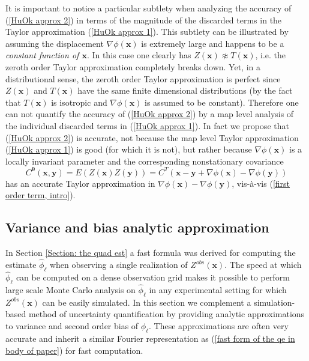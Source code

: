 \documentclass[10pt,noinfoline]{imsart}
\newcommand{\bs}{\boldsymbol}
\begin{document}
It is important to notice a particular subtlety when analyzing the accuracy of  (\ref{HuOk approx 2}) in terms of the magnitude of the discarded terms in the Taylor approximation (\ref{HuOk approx 1}). This subtlety can be illustrated by assuming the displacement $\nabla \phi(\bs x)$ is extremely large and happens to be a \textit{constant function of $\bs x$}. In this case one clearly has $Z(\bs x) \not\approx T(\bs x)$, i.e. the zeroth order Taylor approximation completely breaks down. Yet, in a distributional sense, the zeroth order Taylor approximation is perfect since $Z(\bs x)$ and $T(\bs x)$ have the same finite dimensional distributions (by the fact that $T(\bs x)$ is isotropic and $\nabla \phi(\bs x)$ is assumed to be constant).
Therefore one can not quantify the accuracy of (\ref{HuOk approx 2}) by a map level analysis of the individual discarded terms in (\ref{HuOk approx 1}).
In fact we propose that (\ref{HuOk approx 2}) is accurate, not because the map level Taylor approximation (\ref{HuOk approx 1}) is good (for which it is not), but rather because $\nabla \phi(\bs x)$ is a locally invariant parameter and the corresponding nonstationary covariance
\[
C^{\bs \theta}(\bs x,\bs y)=E(Z(\bs x)Z(\bs y)) = C^T(\bs x - \bs y + \nabla\phi(\bs x) - \nabla\phi(\bs y))
\]
has an accurate Taylor approximation in $\nabla\phi(\bs x) - \nabla\phi(\bs y)$, vis-\`a-vis (\ref{first order term, intro}).



\subsection{Variance and bias analytic approximation}
\label{Section: var and bias}

In Section \ref{Section: the quad est} a fast formula was derived for computing the estimate $\hat \phi_{\bs \ell}$ when observing a single realization of $Z^{obs}(\bs x)$. The speed at which $\hat \phi_{\bs \ell}$ can be computed on a dense observation grid makes it possible to perform large scale Monte Carlo analysis on $\hat\phi_{\bs \ell}$ in any experimental setting for which $Z^{obs}(\bs x)$ can be easily simulated. In this section we complement a simulation-based method of uncertainty quantification by providing analytic approximations to variance and second order bias of $\hat\phi_{\bs \ell}$. These approximations are often very accurate and inherit a similar Fourier representation as (\ref{fast form of the qe in body of paper}) for fast computation.
\end{document}
